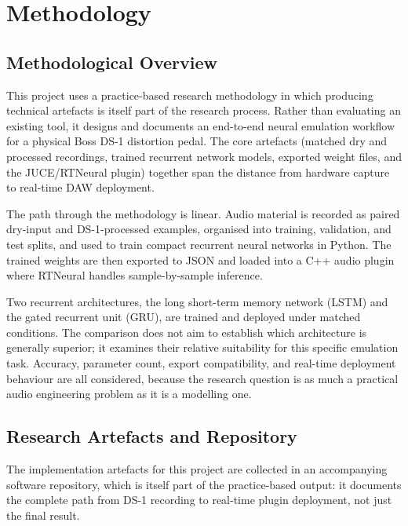 \chapter{Methodology}
\label{chap:methodology}

\section{Methodological Overview}
\label{sec:methodological-overview}

This project uses a practice-based research methodology in which producing technical artefacts is itself part of the research process. Rather than evaluating an existing tool, it designs and documents an end-to-end neural emulation workflow for a physical Boss DS-1 distortion pedal. The core artefacts (matched dry and processed recordings, trained recurrent network models, exported weight files, and the JUCE/RTNeural plugin) together span the distance from hardware capture to real-time DAW deployment.

The path through the methodology is linear. Audio material is recorded as paired dry-input and DS-1-processed examples, organised into training, validation, and test splits, and used to train compact recurrent neural networks in Python. The trained weights are then exported to JSON and loaded into a C++ audio plugin where RTNeural handles sample-by-sample inference.

Two recurrent architectures, the long short-term memory network (LSTM) and the gated recurrent unit (GRU), are trained and deployed under matched conditions. The comparison does not aim to establish which architecture is generally superior; it examines their relative suitability for this specific emulation task. Accuracy, parameter count, export compatibility, and real-time deployment behaviour are all considered, because the research question is as much a practical audio engineering problem as it is a modelling one.

\section{Research Artefacts and Repository}
\label{sec:research-artefacts-repository}

The implementation artefacts for this project are collected in an accompanying software repository, which is itself part of the practice-based output: it documents the complete path from DS-1 recording to real-time plugin deployment, not just the final result.

